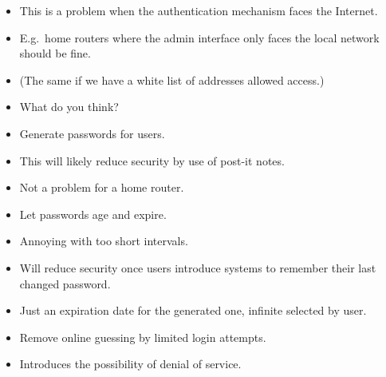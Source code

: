 \begin{frame}
  \begin{exercise}
    \begin{itemize}
      \item This is a problem when the authentication mechanism faces the 
        Internet.

      \item E.g.\ home routers where the admin interface only faces the local 
        network should be fine.

      \item (The same if we have a white list of addresses allowed access.)

      \item What do you think?
    \end{itemize}
  \end{exercise}
\end{frame}

\begin{frame}
  \begin{example}
    \begin{itemize}
      \item Generate passwords for users.
      \item This will likely reduce security by use of post-it notes.
      \item Not a problem for a home router.
    \end{itemize}
  \end{example}
\end{frame}

\begin{frame}
  \begin{example}
    \begin{itemize}
      \item Let passwords age and expire.
      \item Annoying with too short intervals.
      \item Will reduce security once users introduce systems to remember their 
        last changed password.
      \item Just an expiration date for the generated one, infinite selected by
        user.
    \end{itemize}
  \end{example}
\end{frame}

\begin{frame}
  \begin{example}
    \begin{itemize}
      \item Remove online guessing by limited login attempts.
      \item Introduces the possibility of denial of service.
    \end{itemize}
  \end{example}
\end{frame}


